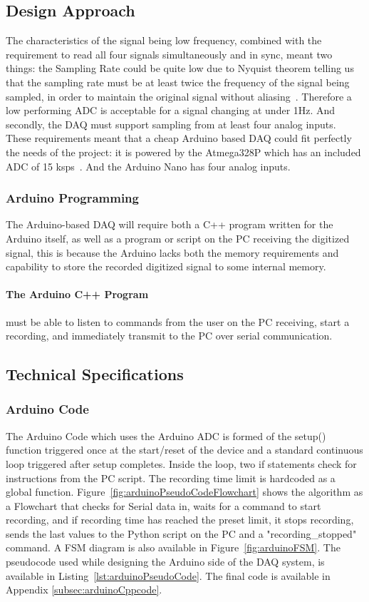 \subsection{Design Approach}
The characteristics of the signal being low frequency, combined with the requirement to read all four signals simultaneously and in sync, meant two things: the Sampling Rate could be quite low due to Nyquist theorem telling us that the sampling rate must be at least twice the frequency of the signal being sampled, in order to maintain the original signal without aliasing~\cite[p. 146]{RefWorks:oppenheim2013discrete-time}. Therefore a low performing ADC is acceptable for a signal changing at under 1Hz. And secondly, the DAQ must support sampling from at least four analog inputs. These requirements meant that a cheap Arduino based DAQ could fit perfectly the needs of the project: it is powered by the Atmega328P which has an included ADC of 15 ksps~\cite[p.205]{RefWorks:atmel2015atmega328p}. And the Arduino Nano has four analog inputs. 
\subsubsection{Arduino Programming}
The Arduino-based DAQ will require both a C++ program written for the Arduino itself, as well as a program or script on the PC receiving the digitized signal, this is because the Arduino lacks both the memory requirements and capability to store the recorded digitized signal to some internal memory.
\paragraph{The Arduino C++ Program} must be able to listen to commands from the user on the PC receiving, start a recording, and immediately transmit to the PC over serial communication. 

\subsection{Technical Specifications}


\subsubsection{Arduino Code}
The Arduino Code which uses the Arduino ADC is formed of the setup() function triggered once at the start/reset of the device and a standard continuous loop triggered after setup completes. Inside the loop, two if statements check for instructions from the PC script. The recording time limit is hardcoded as a global function. Figure~\ref{fig:arduinoPseudoCodeFlowchart} shows the algorithm as a Flowchart that checks for Serial data in, waits for a command to start recording, and if recording time has reached the preset limit, it stops recording, sends the last values to the Python script on the PC and a "recording\_stopped" command. A FSM diagram is also available in Figure~\ref{fig:arduinoFSM}. The pseudocode used while designing the Arduino side of the DAQ system, is available in Listing~\ref{lst:arduinoPseudoCode}. The final code is available in Appendix \ref{subsec:arduinoCppcode}.
